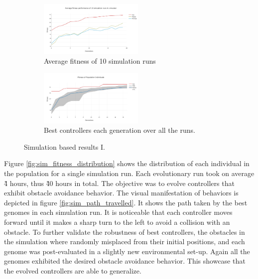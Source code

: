 \begin{figure}[H]
    \centering
    \begin{subfigure}[b]{0.8\textwidth}
    	\centering
        \includegraphics[width=5cm]{include/images/sim_avg_fitness.PNG}
        \caption{Average fitness of 10 simulation runs}
        \label{fig:sim_avg_fitness}
    \end{subfigure}
    \begin{subfigure}[b]{0.8\textwidth}
    	\centering
        \includegraphics[width=5cm]{include/images/sim_best_genomes_percentile.PNG}
        \caption{Best controllers each generation over all the runs.}
        \label{fig:sim_best_genomes_percentile}
    \end{subfigure}
    \caption{Simulation based results I.}
	\label{fig:sim_based_resultsI}
\end{figure}

Figure \ref{fig:sim_fitness_distribution} shows the distribution of each individual in the population for a single simulation run. Each evolutionary run took on average \~4 hours, thus \~40 hours in total. The objective was to evolve controllers that exhibit obstacle avoidance behavior. The visual manifestation of behaviors is depicted in figure \ref{fig:sim_path_travelled}. It shows the path taken by the best genomes in each simulation run. It is noticeable that each controller moves forward until it makes a sharp turn to the left to avoid a collision with an obstacle. To further validate the robustness of best controllers, the obstacles in the simulation where randomly misplaced from their initial positions, and each genome was post-evaluated in a slightly new environmental set-up. Again all the genomes exhibited the desired obstacle avoidance behavior. This showcase that the evolved controllers are able to generalize.

